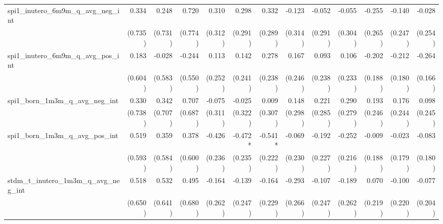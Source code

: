 \begin{tabular}{lrrrrrrrrrrrr}
spi1\_inutero\_6m9m\_q\_avg\_neg\_int       &        0.334 &        0.248 &        0.720 &        0.310 &        0.298 &        0.332 &       -0.123 &       -0.052 &       -0.055 &       -0.255 &       -0.140 &       -0.028 \\ 
                                            &      (0.735) &      (0.731) &      (0.774) &      (0.312) &      (0.291) &      (0.289) &      (0.314) &      (0.291) &      (0.304) &      (0.265) &      (0.247) &      (0.254) \\ 
spi1\_inutero\_6m9m\_q\_avg\_pos\_int       &        0.183 &       -0.028 &       -0.244 &        0.113 &        0.142 &        0.278 &        0.167 &        0.093 &        0.106 &       -0.202 &       -0.212 &       -0.264 \\ 
                                            &      (0.604) &      (0.583) &      (0.550) &      (0.252) &      (0.241) &      (0.238) &      (0.246) &      (0.238) &      (0.233) &      (0.188) &      (0.180) &      (0.166) \\ 
spi1\_born\_1m3m\_q\_avg\_neg\_int          &        0.330 &        0.342 &        0.707 &       -0.075 &       -0.025 &        0.009 &        0.148 &        0.221 &        0.290 &        0.193 &        0.176 &        0.098 \\ 
                                            &      (0.738) &      (0.707) &      (0.687) &      (0.311) &      (0.322) &      (0.307) &      (0.298) &      (0.285) &      (0.279) &      (0.246) &      (0.244) &      (0.245) \\ 
spi1\_born\_1m3m\_q\_avg\_pos\_int          &        0.519 &        0.359 &        0.378 &       -0.426 &      -0.472* &      -0.541* &       -0.069 &       -0.192 &       -0.252 &       -0.009 &       -0.023 &       -0.083 \\ 
                                            &      (0.593) &      (0.584) &      (0.600) &      (0.236) &      (0.235) &      (0.222) &      (0.230) &      (0.227) &      (0.216) &      (0.188) &      (0.179) &      (0.180) \\ 
stdm\_t\_inutero\_1m3m\_q\_avg\_neg\_int    &        0.518 &        0.532 &        0.495 &       -0.164 &       -0.139 &       -0.164 &       -0.293 &       -0.107 &       -0.189 &        0.070 &       -0.100 &       -0.077 \\ 
                                            &      (0.650) &      (0.641) &      (0.680) &      (0.262) &      (0.247) &      (0.229) &      (0.266) &      (0.247) &      (0.262) &      (0.219) &      (0.220) &      (0.204) \\ 

\end{tabular}
